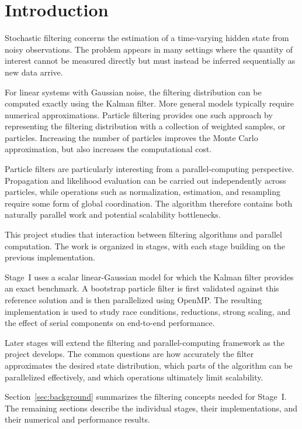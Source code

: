 \section{Introduction}
\label{sec:introduction}

Stochastic filtering concerns the estimation of a time-varying hidden
state from noisy observations. The problem appears in many settings where
the quantity of interest cannot be measured directly but must instead be
inferred sequentially as new data arrive.

For linear systems with Gaussian noise, the filtering distribution can be
computed exactly using the Kalman filter. More general models typically
require numerical approximations. Particle filtering provides one such
approach by representing the filtering distribution with a collection of
weighted samples, or particles. Increasing the number of particles
improves the Monte Carlo approximation, but also increases the
computational cost.

Particle filters are particularly interesting from a parallel-computing
perspective. Propagation and likelihood evaluation can be carried out
independently across particles, while operations such as normalization,
estimation, and resampling require some form of global coordination.
The algorithm therefore contains both naturally parallel work and
potential scalability bottlenecks.

This project studies that interaction between filtering algorithms and
parallel computation. The work is organized in stages, with each stage
building on the previous implementation.

Stage~I uses a scalar linear-Gaussian model for which the Kalman filter
provides an exact benchmark. A bootstrap particle filter is first
validated against this reference solution and is then parallelized using
OpenMP. The resulting implementation is used to study race conditions,
reductions, strong scaling, and the effect of serial components on
end-to-end performance.

Later stages will extend the filtering and parallel-computing framework
as the project develops. The common questions are how accurately the
filter approximates the desired state distribution, which parts of the
algorithm can be parallelized effectively, and which operations ultimately
limit scalability.

Section~\ref{sec:background} summarizes the filtering concepts needed
for Stage~I. The remaining sections describe the individual stages,
their implementations, and their numerical and performance results.